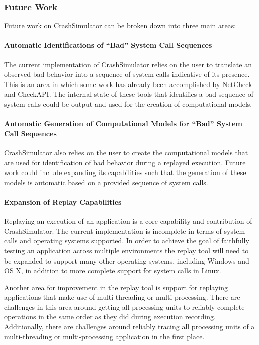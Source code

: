     \subsubsection{Future Work}

    Future work on CrashSimulator can be broken down into three main areas:

        \paragraph{Automatic Identifications of ``Bad'' System Call Sequences}

        The current implementation of CrashSimulator relies on the user to translate an observed bad behavior into a
        sequence of system calls indicative of its presence.  This is an area in which some work has already been
        accomplished by NetCheck and CheckAPI.  The internal state of these tools that identifies a bad sequence of
        system calls could be output and used for the creation of computational models.

        \paragraph{Automatic Generation of Computational Models for ``Bad'' System Call Sequences}

        CrashSimulator also relies on the user to create the computational models that are used for identification of
        bad behavior during a replayed execution.  Future work could include expanding its capabilities such that the
        generation of these models is automatic based on a provided sequence of system calls.
        
        \paragraph{Expansion of Replay Capabilities}

        Replaying an execution of an application is a core capability and contribution of CrashSimulator.  The current
        implementation is incomplete in terms of system calls and operating systems supported.  In order to achieve the
        goal of faithfully testing an application across multiple environments the replay tool will need to be expanded
        to support many other operating systems, including Windows and OS X, in addition to more complete support for
        system calls in Linux.

        Another area for improvement in the replay tool is support for replaying applications that make use of
        multi-threading or multi-processing.  There are challenges in this area around getting all processing units to
        reliably complete operations in the same order as they did during execution recording.  Additionally, there are
        challenges around reliably tracing all processing units of a multi-threading or multi-processing application in
        the first place.
    


